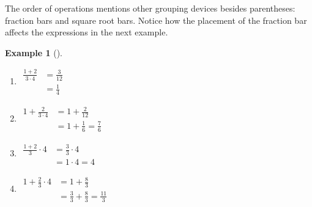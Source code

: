 \documentclass[10pt,]{book}
\theoremstyle{plain}
\theoremstyle{definition}
\theoremstyle{definition}
\newtheorem{example}[theorem]{Example}
\theoremstyle{definition}
\numberwithin{equation}{part}
\newcommand{\amp}{&}
\begin{document}
\par
The order of operations mentions other grouping devices besides parentheses: fraction bars and square root bars. Notice how the placement of the fraction bar affects the expressions in the next example.%
\begin{example}[]\label{example-6}
\leavevmode%
\begin{enumerate}[label=*\alph**]
\item\hypertarget{li-93}{}\(\begin{aligned}
\frac{1+2}{3\cdot 4} \amp = \frac{3}{12}\\
\amp = \frac{1}{4}
\end{aligned}\)%
\item\hypertarget{li-94}{}\(\begin{aligned}
1+\frac{2}{3\cdot 4} \amp = 1+ \frac{2}{12}\\
\amp = 1+\frac{1}{6}=\frac{7}{6}
\end{aligned}                \)%
\item\hypertarget{li-95}{}\(\begin{aligned}
\frac{1+2}{3}\cdot 4 \amp = \frac{3}{3}\cdot 4\\
\amp = 1\cdot 4=4
\end{aligned}\)%
\item\hypertarget{li-96}{}\(\begin{aligned}
1+\frac{2}{3}\cdot 4 \amp = 1+ \frac{8}{3}\\
\amp = \frac{3}{3}+\frac{8}{3}=\frac{11}{3}
\end{aligned}                \)%
\end{enumerate}
%
\end{example}
\typeout{************************************************}
\typeout{************************************************}
\end{document}
